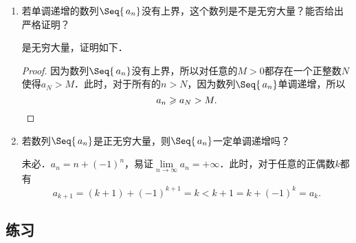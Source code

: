 \begin{enumerate}
\item 若单调递增的数列\(\Seq{\,a_n}\)没有上界，这个数列是不是无穷大量？能否给出严格证明？

  \ifshowsolp
    是无穷大量，证明如下．

    \begin{proof}
      因为数列\(\Seq{\,a_n}\)没有上界，所以对任意的\(M > 0\)都存在一个正整数\(N\)使得\(a_N > M\)．此时，对于所有的\(n > N\)，因为数列\(\Seq{\,a_n}\)单调递增，所以
      \begin{equation*}
        a_n \ge a_N > M. \qedhere
      \end{equation*}
    \end{proof}
  \fi

\item 若数列\(\Seq{\,a_n}\)是正无穷大量，则\(\Seq{\,a_n}\)一定单调递增吗？

  \ifshowsolp
    未必．\(a_n = n + (-1)^n\)，易证\(\lim\limits_{n\to\infty} a_n = +\infty\)．此时，对于任意的正偶数\(k\)都有
    \begin{equation*}
      a_{k+1} = (k+1) + (-1)^{k+1} = k < k + 1 = k + (-1)^k = a_k.
    \end{equation*}
  \fi
\end{enumerate}

\ifshowex
{}
\subsection*{练习}

